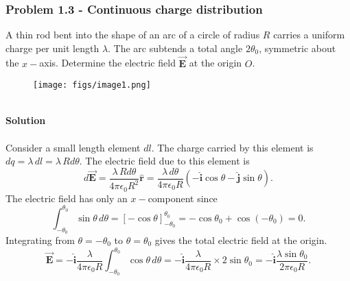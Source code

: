 \documentclass{article}
\begin{document}
\subsubsection*{Problem 1.3 - Continuous charge distribution}
A thin rod bent into the shape of an arc of a circle of radius $R$ carries a uniform charge per unit length $\lambda$. The arc subtends a total angle $2\theta_0$, symmetric about the $x-$axis. Determine the electric field $\Vec{\boldsymbol{E}}$ at the origin $O$.
\begin{figure}[h]
        \centering
        \texttt{[image: figs/image1.png]}
    \end{figure}
\\\textbf{Solution}
\\
\\Consider a small length element $dl$. The charge carried by this element is $dq=\lambda\,dl=\lambda\,Rd\theta$. The electric field due to this element is
\[d\Vec{\boldsymbol{E}}=\frac{\lambda\,Rd\theta}{4\pi\epsilon_0R^2}\boldsymbol{\hat{r}}=\frac{\lambda\,d\theta}{4\pi\epsilon_0R}(-\boldsymbol{\hat{i}}\cos\theta-\boldsymbol{\hat{j}}\sin\theta).\]
The electric field has only an $x-$component since
\[\int_{-\theta_0}^{\theta_0}\sin\theta\,d\theta=\left[-\cos\theta\right]_{-\theta_0}^{\theta_0}=-\cos\theta_0+\cos(-\theta_0)=0.\]
Integrating from $\theta=-\theta_0$ to $\theta=\theta_0$ gives the total electric field at the origin.
\[\Vec{\boldsymbol{E}}=-\boldsymbol{\hat{i}}\frac{\lambda}{4\pi\epsilon_0R}\int_{-\theta_0}^{\theta_0}\cos\theta\,d\theta=-\boldsymbol{\hat{i}}\frac{\lambda}{4\pi\epsilon_0R}\times2\sin\theta_0=-\boldsymbol{\hat{i}}\frac{\lambda\sin\theta_0}{2\pi\epsilon_0R}.\]
\end{document}

